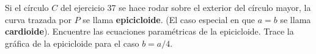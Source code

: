 \item Si el círculo $C$ del ejercicio 37 se hace rodar sobre el exterior del círculo mayor, la curva trazada por $P$ se llama \textbf{epicicloide}. (El caso especial en que $a = b$ se llama \textbf{cardioide}). Encuentre las ecuaciones paramétricas de la epicicloide. Trace la gráfica de la epicicloide para el caso $b = a/4$.
